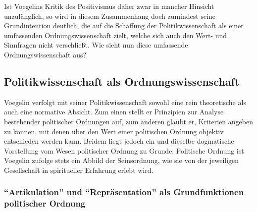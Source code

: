 Ist Voegelins Kritik des Positivismus daher zwar in mancher Hinsicht
unzulänglich, so wird in diesem Zusammenhang doch zumindest seine
Grundintention deutlich, die auf die Schaffung der Politikwissenschaft als
einer umfassenden Ordnungswissenschaft zielt, welche sich auch den Wert- und
Sinnfragen nicht verschließt.  Wie sieht nun diese umfassende
Ordnungswissenschaft aus?

\subsection{Politikwissenschaft als Ordnungswissenschaft}

Voegelin verfolgt mit seiner Politikwissenschaft sowohl eine rein
theoretische als auch eine normative Absicht. Zum einen stellt er Prinzipien
zur Analyse bestehender politischer Ordnungen auf, zum anderen glaubt er,
Kriterien angeben zu können, mit denen über den Wert einer politischen Ordnung
objektiv entschieden werden kann. Beidem liegt jedoch ein und dieselbe
dogmatische Vorstellung vom Wesen politischer Ordnung zu Grunde: Politische
Ordnung ist Voegelin zufolge stets ein Abbild der Seinsordnung, wie sie von
der jeweiligen Gesellschaft in spiritueller Erfahrung erlebt wird.

\subsubsection{"`Artikulation"' und "`Repräsentation"' als Grundfunktionen
  politischer Ordnung}


